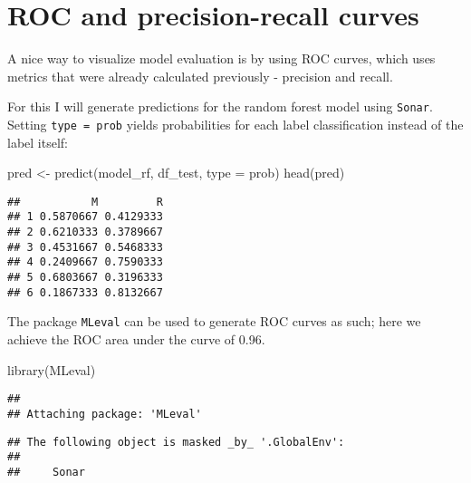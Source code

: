 \documentclass[
]{book}
\newenvironment{Shaded}{\begin{snugshade}}{\end{snugshade}}
\newcommand{\AttributeTok}[1]{\textcolor[rgb]{0.77,0.63,0.00}{#1}}
\newcommand{\ConstantTok}[1]{\textcolor[rgb]{0.00,0.00,0.00}{#1}}
\newcommand{\FunctionTok}[1]{\textcolor[rgb]{0.00,0.00,0.00}{#1}}
\newcommand{\NormalTok}[1]{#1}
\newcommand{\OtherTok}[1]{\textcolor[rgb]{0.56,0.35,0.01}{#1}}
\newcommand{\SpecialCharTok}[1]{\textcolor[rgb]{0.00,0.00,0.00}{#1}}
\newcommand{\StringTok}[1]{\textcolor[rgb]{0.31,0.60,0.02}{#1}}
\begin{document}
\hypertarget{roc-and-precision-recall-curves}{%
\section{ROC and precision-recall curves}\label{roc-and-precision-recall-curves}}

A nice way to visualize model evaluation is by using ROC curves, which uses metrics that were already calculated previously - precision and recall.

For this I will generate predictions for the random forest model using \texttt{Sonar}. Setting \texttt{type\ =\ \textquotesingle{}prob\textquotesingle{}} yields probabilities for each label classification instead of the label itself:

\begin{Shaded}
\begin{Highlighting}[]
\NormalTok{pred }\OtherTok{\textless{}{-}} \FunctionTok{predict}\NormalTok{(model\_rf, df\_test, }\AttributeTok{type =} \StringTok{\textquotesingle{}prob\textquotesingle{}}\NormalTok{)}
\FunctionTok{head}\NormalTok{(pred)}
\end{Highlighting}
\end{Shaded}

\begin{verbatim}
##           M         R
## 1 0.5870667 0.4129333
## 2 0.6210333 0.3789667
## 3 0.4531667 0.5468333
## 4 0.2409667 0.7590333
## 5 0.6803667 0.3196333
## 6 0.1867333 0.8132667
\end{verbatim}

The package \texttt{MLeval} can be used to generate ROC curves as such; here we achieve the ROC area under the curve of 0.96.

\begin{Shaded}
\begin{Highlighting}[]
\FunctionTok{library}\NormalTok{(MLeval)}
\end{Highlighting}
\end{Shaded}

\begin{verbatim}
## 
## Attaching package: 'MLeval'
\end{verbatim}

\begin{verbatim}
## The following object is masked _by_ '.GlobalEnv':
## 
##     Sonar
\end{verbatim}

\begin{Shaded}
\end{Shaded}
\end{document}
